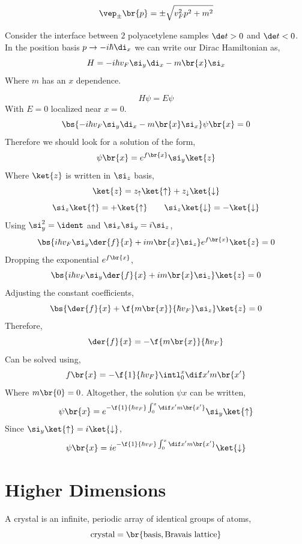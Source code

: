 \documentclass{article}
\begin{document}
\[ \vep_{\pm}\br{p} = \pm \sqrt{v_F^2 p^2 + m^2} \]

Consider the interface between $2$ polyacetylene samples $\de t > 0$ and $\de t < 0$. In the position basis $p \to - i \hbar \di_x$ we can write our Dirac Hamiltonian as,
\[ H = - i \hbar v_F \si_y \di_x - m\br{x} \si_x \]
Where $m$ has an $x$ dependence.

\[  H \psi = E \psi \]
With $E = 0$ localized near $x = 0$.
\[ \bs{- i \hbar v_F \si_y \di_x - m\br{x} \si_x} \psi\br{x} = 0 \]
Therefore we should look for a solution of the form,
\[ \psi\br{x} = e^{f\br{x}} \si_y \ket{z} \]
Where $\ket{z}$ is written in $\si_z$ basis,
\[ \ket{z} = z_{\uparrow} \ket{\uparrow} + z_{\downarrow} \ket{\downarrow} \]
\[ \si_{z}\ket{\uparrow} = + \ket{\uparrow} \qquad \si_{z}\ket{\downarrow} = - \ket{\downarrow} \]
Using $\si_y^2 = \ident$ and $\si_x \si_y = i \si_z$,
\[ \bs{i \hbar v_F \si_y \der{f}{x} + i m\br{x} \si_z} e^{f\br{x}}\ket{z} = 0 \]
Dropping the exponential $e^{f\br{x}}$,
\[ \bs{i \hbar v_F \si_y \der{f}{x} + i m\br{x} \si_z} \ket{z} = 0 \]
Adjusting the constant coefficients,
\[ \bs{\der{f}{x} + \f{m\br{x}}{\hbar v_F} \si_z} \ket{z} = 0 \]
Therefore,
\[ \der{f}{x} = - \f{m\br{x}}{\hbar v_F} \]
Can be solved using,
\[ f\br{x} = - \f{1}{\hbar v_F} \intl_{0}^{x} \dif x' m\br{x'} \]
Where $m\br{0} = 0$. Altogether, the solution $\psi{x}$ can be written,
\[ \psi\br{x} = e^{- \f{1}{\hbar v_F} \int_{0}^{x} \dif x' m\br{x'}} \si_y \ket{\uparrow} \]
Since $\si_y \ket{\uparrow} = i \ket{\downarrow}$,
\[ \psi\br{x} = ie^{- \f{1}{\hbar v_F} \int_{0}^{x} \dif x' m\br{x'}}\ket{\downarrow} \]

\begin{center}
\end{center}

\section{Higher Dimensions}

A crystal is an infinite, periodic array of identical groups of atoms,
\[ \text{crystal} = \br{\text{basis}, \text{Bravais lattice}} \]
\end{document}
